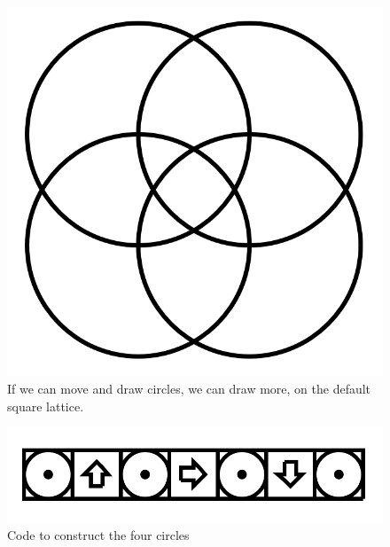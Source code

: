 \documentclass[11pt]{book}
\begin{document}
\begin{figure}

\includegraphics[width=\linewidth]{../figures/squarecircles.png}

\caption{If we can move and draw circles, we can draw more, on the default square lattice.}
\end{figure}


\begin{figure}

\includegraphics[width=\linewidth]{../figures/squarecirclescode.png}

\caption{Code to construct the four circles}
\end{figure}
\end{document}
